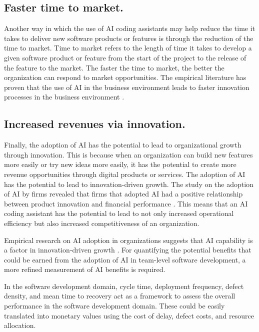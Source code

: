 \subsection {Faster time to market.}
\label{sec:Faster time to market}
Another way in which the use of AI coding assistants may help reduce the time it takes to deliver new software products or features is through the reduction of the time to market. Time to market refers to the length of time it takes to develop a given software product or feature from the start of the project to the release of the feature to the market. The faster the time to market, the better the organization can respond to market opportunities. The empirical literature has proven that the use of AI in the business environment leads to faster innovation processes in the business environment \autocite{Babina2024}.

\subsection {Increased revenues via innovation.}
\label{sec:Increased revenues via innovation}
Finally, the adoption of AI has the potential to lead to organizational growth through innovation. This is because when an organization can build new features more easily or try new ideas more easily, it has the potential to create more revenue opportunities through digital products or services. The adoption of AI has the potential to lead to innovation-driven growth. The study on the adoption of AI by firms revealed that firms that adopted AI had a positive relationship between product innovation and financial performance \autocite{Babina2024}. This means that an AI coding assistant has the potential to lead to not only increased operational efficiency but also increased competitiveness of an organization.

Empirical research on AI adoption in organizations suggests that AI capability is a factor in innovation-driven growth \autocite{Babina2024}. For quantifying the potential benefits that could be earned from the adoption of AI in team-level software development, a more refined measurement of AI benefits is required. 

In the software development domain, cycle time, deployment frequency, defect density, and mean time to recovery act as a framework to assess the overall performance in the software development domain. These could be easily translated into monetary values using the cost of delay, defect costs, and resource allocation. 


